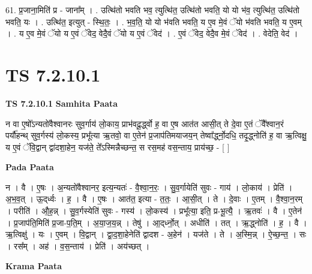 \documentclass[17pt]{extarticle}
\begin{document}
61. प्र॒जाना॒मिति॑ प्र - जाना᳚म् । . उत्थि॑तो भवति भव॒ त्युत्थि॑त॒ उत्थि॑तो भवति॒ यो यो भ॑व॒ त्युत्थि॑त॒ उत्थि॑तो भवति॒ यः । . उत्थि॑त॒ इत्युत् - स्थि॒तः॒ । . भ॒व॒ति॒ यो यो भ॑वति भवति॒ य ए॒व मे॒वं ॅयो भ॑वति भवति॒ य ए॒वम् । . य ए॒व मे॒वं ॅयो य ए॒वं ॅवेद॒ वेदै॒वं ॅयो य ए॒वं ॅवेद॑ । . ए॒वं ॅवेद॒ वेदै॒व मे॒वं ॅवेद॑ । . वेदेति॒ वेद॑ । \newline
\pagebreak
{}

\section{ TS 7.2.10.1 }

\textbf{TS 7.2.10.1 } \newline
\textbf{Samhita Paata} \newline

न वा ए॒षो᳚ऽन्यतो॑वैश्वानरः सुव॒र्गाय॑ लो॒काय॒ प्राभ॑वदू॒र्द्ध्वो ह॒ वा ए॒ष आत॑त आसी॒त् ते दे॒वा ए॒तं ॅवै᳚श्वान॒रं पर्यौ॑हन्थ् सुव॒र्गस्य॑ लो॒कस्य॒ प्रभू᳚त्या ऋ॒तवो॒ वा ए॒तेन॑ प्र॒जाप॑तिमयाजय॒न् तेष्वा᳚र्द्ध्नो॒दधि॒ तदृ॒द्ध्नोति॑ ह॒ वा ऋ॒त्विक्षु॒ य ए॒वं ॅवि॒द्वान् द्वा॑दशा॒हेन॒ यज॑ते॒ ते᳚ऽस्मिन्नैच्छन्त॒ स रस॒मह॑ वस॒न्ताय॒ प्राय॑च्छ॒ - [  ] \newline

\textbf{Pada Paata} \newline

न । वै । ए॒षः । अ॒न्यतो॑वैश्वानर॒ इत्य॒न्यतः॑ - वै॒श्वा॒न॒रः॒ । सु॒व॒र्गायेति॑ सुवः - गाय॑ । लो॒काय॑ । प्रेति॑ । अ॒भ॒व॒त् । ऊ॒द्‌र्ध्वः । ह॒ । वै । ए॒षः । आत॑त॒ इत्या - त॒तः॒ । आ॒सी॒त् । ते । दे॒वाः । ए॒तम् । वै॒श्वा॒न॒रम् । परीति॑ । औ॒ह॒न्न् । सु॒व॒र्गस्येति॑ सुवः - गस्य॑ । लो॒कस्य॑ । प्रभू᳚त्या॒ इति॒ प्र-भू॒त्यै॒ । ऋ॒तवः॑ । वै । ए॒तेन॑ । प्र॒जाप॑ति॒मिति॑ प्र॒जा-प॒ति॒म् । अ॒या॒ज॒य॒न्न् । तेषु॑ । आ॒द्‌र्ध्नो॒त् । अधीति॑ । तत् । ऋ॒द्ध्नोति॑ । ह॒ । वै । ऋ॒त्विक्षु॑ । यः । ए॒वम् । वि॒द्वान् । द्वा॒द॒शा॒हेनेति॑ द्वादश - अ॒हेन॑ । यज॑ते । ते । अ॒स्मि॒न्न् । ऐ॒च्छ॒न्त॒ । सः । रस᳚म् । अह॑ । व॒स॒न्ताय॑ । प्रेति॑ । अय॑च्छत् ।  \newline


\textbf{Krama Paata} \newline
\end{document}
